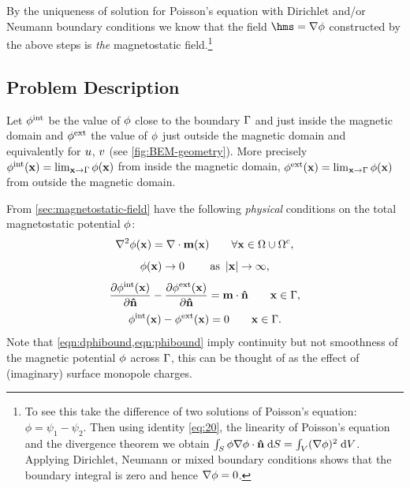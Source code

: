 By the uniqueness of solution for Poisson's equation with Dirichlet and/or Neumann boundary conditions we know that the field $ \hms = \grad \phim$  constructed by the above steps is \emph{the} magnetostatic field.\footnote{To see this take the difference of two solutions of Poisson's equation: $\phi = \psi_1 - \psi_2$.
Then using identity \cref{eq:20}, the linearity of Poisson's equation and the divergence theorem we obtain $\int_S \phi \nabla \phi \cdot \boldsymbol{\mathrm{\hat{n}}} {\; \mathrm{{d}}} S = \int_V (\nabla \phi)^2 {\; \mathrm{{d}}} V$.
Applying Dirichlet, Neumann or mixed boundary conditions shows that the boundary integral is zero and hence $\nabla \phi = 0$.}

\subsection{Problem Description}
\label{sec:problem-description}
Let $\phi^{\mathrm{int}}$ be the value of $\phi$ close to the boundary ${\Gamma}$ and just inside the magnetic domain and $\phi^{\mathrm{ext}}$ the value of $\phi$ just outside the magnetic domain and equivalently for $u$, $v$ (see \cref{fig:BEM-geometry}).
More precisely $\phi^{\mathrm{int}}(\boldsymbol{\mathrm{x}}) = \lim_{\boldsymbol{\mathrm{x}} \rightarrow {\Gamma}} \phi(\boldsymbol{\mathrm{x}})$ from inside the magnetic domain, $\phi^{\mathrm{ext}}(\boldsymbol{\mathrm{x}}) = \lim_{\boldsymbol{\mathrm{x}} \rightarrow {\Gamma}} \phi(\boldsymbol{\mathrm{x}})$ from outside the magnetic domain.

From \cref{sec:magnetostatic-field} have the following \emph{physical} conditions on the total magnetostatic potential $\phi$:
\begin{equation}
  \nabla^2 \phi(\boldsymbol{\mathrm{x}}) = \nabla \cdot \boldsymbol{\mathrm{m}}(\boldsymbol{\mathrm{x}}) \qquad \forall \boldsymbol{\mathrm{x}} \in \Omega \cup {\Omega^c},
  \label{eq:2}
\end{equation}
\begin{equation}
  \phi(\boldsymbol{\mathrm{x}}) \rightarrow 0 \qquad \text{ as } \left|{\boldsymbol{\mathrm{x}}} \right| \rightarrow \infty,
\label{eq:48}
\end{equation}
\begin{equation}
  \frac{\partial \phi^{\mathrm{int}}(\boldsymbol{\mathrm{x}})}{\partial \boldsymbol{\mathrm{\hat{n}}}} - \frac{\partial \phi^{\mathrm{ext}}(\boldsymbol{\mathrm{x}})}{\partial \boldsymbol{\mathrm{\hat{n}}}} = \boldsymbol{\mathrm{m}} \cdot \boldsymbol{\mathrm{\hat{n}}} \qquad \boldsymbol{\mathrm{x}} \in {\Gamma},
  \label{eqn:dphibound}
\end{equation}
\begin{equation}
  \phi^{\mathrm{int}}(\boldsymbol{\mathrm{x}}) - \phi^{\mathrm{ext}}(\boldsymbol{\mathrm{x}})  = 0 \qquad \boldsymbol{\mathrm{x}} \in {\Gamma}.
  \label{eqn:phibound}
\end{equation}
Note that \cref{eqn:dphibound,eqn:phibound} imply continuity but not smoothness of the magnetic potential $\phi$ across ${\Gamma}$, this can be thought of as the effect of (imaginary) surface monopole charges.

